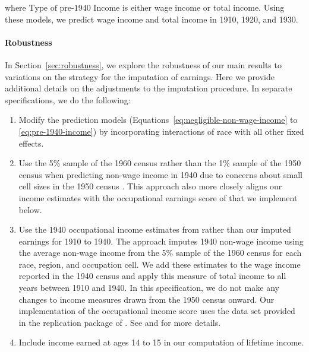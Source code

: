 \documentclass[12pt]{article}
\begin{document}
\noindent where $\text{Type of pre-1940 Income}$ is either wage income or total income. 
Using these models, we predict wage income and total income in 1910, 1920, and 1930. 

\paragraph{Robustness}
In Section~\ref{sec:robustness}, we explore the robustness of our main results to variations on the strategy for the imputation of earnings. 
Here we provide additional details on the adjustments to the imputation procedure. 
In separate specifications, we do the following:
\begin{enumerate}
    \item Modify the prediction models (Equations~\ref{eq:negligible-non-wage-income} to \ref{eq:pre-1940-income}) by incorporating interactions of race with all other fixed effects.  
    \item Use the 5\% sample of the 1960 census rather than the 1\% sample of the 1950 census  when predicting non-wage income in 1940 due to concerns about small cell sizes in the 1950 census . This approach also more closely aligns our income estimates with the occupational earnings score of  that we implement below. 
    \item Use the 1940 occupational income estimates from  rather than our imputed earnings for 1910 to 1940. The  approach imputes 1940 non-wage income using the average non-wage income from the 5\% sample of the 1960 census for each race, region, and occupation cell. We add these estimates to the wage income reported in the 1940 census and apply this measure of total income to all years between 1910 and 1940. In this specification, we do not make any changes to income measures drawn from the 1950 census onward. Our implementation of the  occupational income score uses the data set provided in the replication package of . See  and  for more details. 
    \item Include income earned at ages 14 to 15 in our computation of lifetime income. 
\end{enumerate}

\newpage
\FloatBarrier
\setlength{\bibsep}{3pt}

\begin{spacing}{0}
{\small{}}
\end{spacing}
\end{document}
